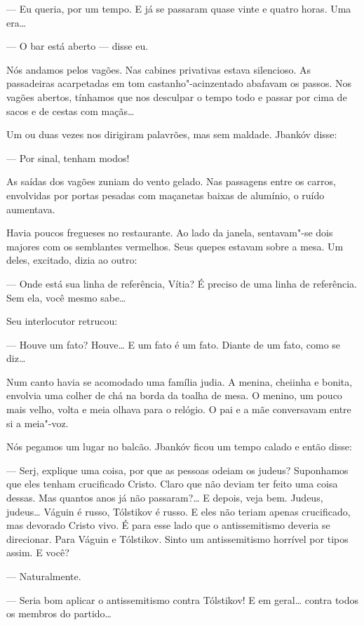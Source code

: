 --- Eu queria, por um tempo. E já se passaram quase vinte e
quatro horas. Uma era\ldots{}

--- O bar está aberto --- disse eu.

Nós andamos pelos vagões. Nas cabines privativas estava silencioso. As
passadeiras acarpetadas em tom castanho"-acinzentado abafavam os passos.
Nos vagões abertos, tínhamos que nos desculpar o tempo todo e passar por
cima de sacos e de cestas com maçãs\ldots{}

Um ou duas vezes nos dirigiram palavrões, mas sem maldade. Jbankóv
disse:

--- Por sinal, tenham modos!

As saídas dos vagões zuniam do vento gelado. Nas passagens entre os
carros, envolvidas por portas pesadas com maçanetas baixas de alumínio,
o ruído aumentava.

Havia poucos fregueses no restaurante. Ao lado da janela, sentavam"-se
dois majores com os semblantes vermelhos. Seus quepes estavam sobre a
mesa. Um deles, excitado, dizia ao outro:

--- Onde está sua linha de referência, Vítia? É preciso de uma
linha de referência. Sem ela, você mesmo sabe\ldots{}

Seu interlocutor retrucou:

--- Houve um fato? Houve\ldots{} E um fato é um fato. Diante de um
fato, como se diz\ldots{}

Num canto havia se acomodado uma família judia. A menina, cheiinha e
bonita, envolvia uma colher de chá na borda da toalha de mesa. O menino,
um pouco mais velho, volta e meia olhava para o relógio. O pai e a mãe
conversavam entre si a meia"-voz.

Nós pegamos um lugar no balcão. Jbankóv ficou um tempo calado e então
disse:

--- Serj, explique uma coisa, por que as pessoas odeiam os
judeus? Suponhamos que eles tenham crucificado Cristo. Claro que não
deviam ter feito uma coisa dessas. Mas quantos anos já não passaram?\ldots{}
E depois, veja bem. Judeus, judeus\ldots{} Váguin é russo, Tólstikov é russo.
E eles não teriam apenas crucificado, mas devorado Cristo vivo. É para
esse lado que o antissemitismo deveria se direcionar. Para Váguin e
Tólstikov. Sinto um antissemitismo horrível por tipos assim. E você?

--- Naturalmente.

--- Seria bom aplicar o antissemitismo contra Tólstikov! E em
geral\ldots{} contra todos os membros do partido\ldots{}

